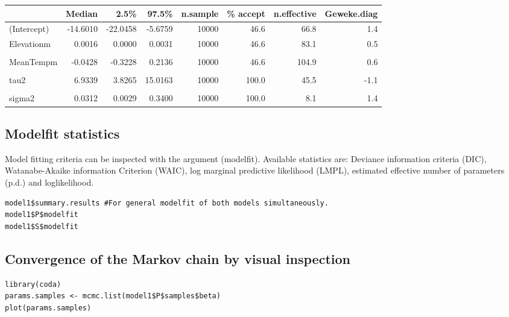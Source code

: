\documentclass[11pt]{article}
\begin{document}
\begin{center}
\begin{tabular}{lrrrrrrr}
 & Median & 2.5\% & 97.5\% & n.sample & \% accept & n.effective & Geweke.diag\\
\hline
(Intercept) & -14.6010 & -22.0458 & -5.6759 & 10000 & 46.6 & 66.8 & 1.4\\
Elevationm & 0.0016 & 0.0000 & 0.0031 & 10000 & 46.6 & 83.1 & 0.5\\
 &  &  &  &  &  &  & \\
MeanTempm & -0.0428 & -0.3228 & 0.2136 & 10000 & 46.6 & 104.9 & 0.6\\
 &  &  &  &  &  &  & \\
tau2 & 6.9339 & 3.8265 & 15.0163 & 10000 & 100.0 & 45.5 & -1.1\\
 &  &  &  &  &  &  & \\
sigma2 & 0.0312 & 0.0029 & 0.3400 & 10000 & 100.0 & 8.1 & 1.4\\
\end{tabular}
\end{center}

\subsection{Modelfit statistics}
\label{sec:org2747ae5}
Model fitting criteria can be inspected with the argument (modelfit). Available statistics are:
Deviance information criteria (DIC), Watanabe-Akaike information Criterion (WAIC), log marginal predictive likelihood (LMPL), estimated effective number of parameters (p.d.) and  loglikelihood.

\begin{verbatim}
model1$summary.results #For general modelfit of both models simultaneously.
model1$P$modelfit
model1$S$modelfit
\end{verbatim}

\subsection{Convergence of the Markov chain by visual inspection}
\label{sec:org265df21}
\begin{verbatim}
library(coda)
params.samples <- mcmc.list(model1$P$samples$beta)
plot(params.samples)
\end{verbatim}
\end{document}
